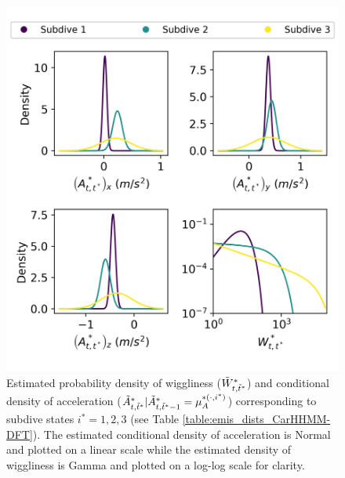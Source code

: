 \begin{figure}[ht]
	\centering
	\includegraphics[width=5in]{../Plots/CarHHMM2-fine-emissions.png}
	\caption{Estimated probability density of wiggliness ($\tilde{W}^*_{t,\tilde t^*}$) and conditional density of acceleration ($\tilde{A}^*_{t,\tilde t^*}|\tilde{A}^*_{t,\tilde t^*-1} = \mu_A^{*(\cdot,i^*)}$) corresponding to subdive states $i^* = 1,2,3$ (see Table \ref{table:emis_dists_CarHHMM-DFT}). The estimated conditional density of acceleration is Normal and plotted on a linear scale while the estimated density of wiggliness is Gamma and plotted on a log-log scale for clarity.}
	\label{fig:fine_emis}
\end{figure}

